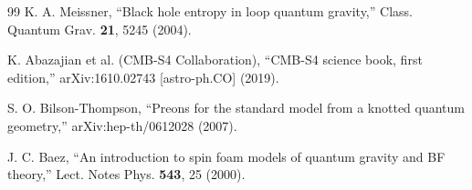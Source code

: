 \documentclass[twocolumn,aps,prd,showpacs,preprintnumbers,longbibliography]{revtex4-2}
\begin{document}
\begin{thebibliography}{99}
		K. A. Meissner, “Black hole entropy in loop quantum gravity,” Class. Quantum Grav. \textbf{21}, 5245 (2004).
		
		K. Abazajian et al. (CMB-S4 Collaboration), “CMB-S4 science book, first edition,” arXiv:1610.02743 [astro-ph.CO] (2019).
		
		S. O. Bilson-Thompson, “Preons for the standard model from a knotted quantum geometry,” arXiv:hep-th/0612028 (2007).
		
		J. C. Baez, “An introduction to spin foam models of quantum gravity and BF theory,” Lect. Notes Phys. \textbf{543}, 25 (2000).
		
	\end{thebibliography}
	
\end{document}
